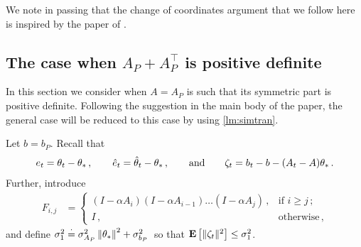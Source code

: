 We note in passing that the change of coordinates argument that we follow here is inspired 
by the paper of \citet{lihong}. 

\subsection{The case when $A_P+A_P^\top$ is positive definite}
In this section we consider  when $A=A_P$ is such that its symmetric part is positive definite.
Following the suggestion in the main body of the paper, the general case will be reduced to this case by using 
\cref{lm:simtran}.

Let $b = b_P$.
Recall that 
\begin{align*}
e_t =  \theta_t-\theta_*\,, \qquad 
\hat{e}_t = \hat{\theta}_t-\theta_*\,, \qquad  \text{and} \qquad 
\zeta_t = b_t-b-(A_t-A)\theta_*\,.
\end{align*}
Further, introduce
\begin{align*}
F_{i,j} & =
\begin{cases}
 (I-\alpha A_i)(I-\alpha A_{i-1}) \dots (I-\alpha A_j)\,, & \text{if } i\ge j\,;\\
 I\,, & \text{otherwise}\,,
\end{cases}
\end{align*}
and define $\sigma_1^2 \stackrel{\cdot}{=} \sigma_{A_P}^2\left\| \theta_*\right\|^2+\sigma_{b_P}^2\,$ so that 
$\mathbf{E}\left[\| \zeta_t\|^2\right]\leq \sigma_1^2$.

